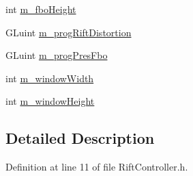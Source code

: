 \begin{DoxyCompactItemize}
\item 
int \hyperlink{class_b_g_e_1_1_rift_controller_aeb6771de1ecc506acf703a4925fae663}{m\-\_\-fbo\-Height}
\item 
G\-Luint \hyperlink{class_b_g_e_1_1_rift_controller_ad621871816bc29c8f53b17a8f2aed74a}{m\-\_\-prog\-Rift\-Distortion}
\item 
G\-Luint \hyperlink{class_b_g_e_1_1_rift_controller_a8edafc61581313d7e1f3053bfe8c1561}{m\-\_\-prog\-Pres\-Fbo}
\item 
int \hyperlink{class_b_g_e_1_1_rift_controller_a4148f05449ea0ad8abb4fc1b6e06cc10}{m\-\_\-window\-Width}
\item 
int \hyperlink{class_b_g_e_1_1_rift_controller_ae4d2d0702bd52b47c5374d36c4b860e4}{m\-\_\-window\-Height}
\end{DoxyCompactItemize}


\subsection{Detailed Description}


Definition at line 11 of file Rift\-Controller.\-h.



